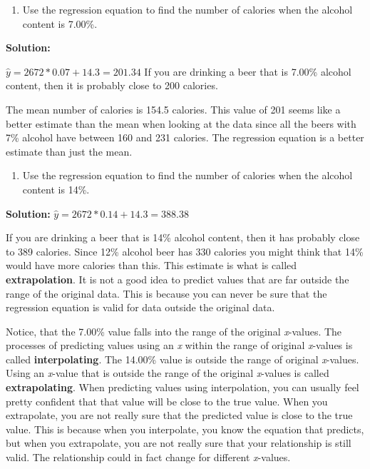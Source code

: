 \documentclass[
]{book}
\providecommand{\tightlist}{%
  \setlength{\itemsep}{0pt}\setlength{\parskip}{0pt}}
\begin{document}
\begin{enumerate}
\def\labelenumi{\alph{enumi}.}
\setcounter{enumi}{1}
\tightlist
\item
  Use the regression equation to find the number of calories when the alcohol content is 7.00\%.
\end{enumerate}

\textbf{Solution:}

\(\hat{y}=2672*0.07+14.3=201.34\) If you are drinking a beer that is 7.00\% alcohol content, then it is probably close to 200 calories.

The mean number of calories is 154.5 calories. This value of 201 seems like a better estimate than the mean when looking at the data since all the beers with 7\% alcohol have between 160 and 231 calories. The regression equation is a better estimate than just the mean.

\begin{enumerate}
\def\labelenumi{\alph{enumi}.}
\setcounter{enumi}{2}
\tightlist
\item
  Use the regression equation to find the number of calories when the alcohol content is 14\%.
\end{enumerate}

\textbf{Solution:}
\(\hat{y}=2672*0.14+14.3=388.38\)

If you are drinking a beer that is 14\% alcohol content, then it has probably close to 389 calories. Since 12\% alcohol beer has 330 calories you might think that 14\% would have more calories than this. This estimate is what is called \textbf{extrapolation}. It is not a good idea to predict values that are far outside the range of the original data. This is because you can never be sure that the regression equation is valid for data outside the original data.

Notice, that the 7.00\% value falls into the range of the original \emph{x}-values. The processes of predicting values using an \emph{x} within the range of original \emph{x}-values is called \textbf{interpolating}. The 14.00\% value is outside the range of original \emph{x}-values. Using an \emph{x}-value that is outside the range of the original \emph{x}-values is called \textbf{extrapolating}. When predicting values using interpolation, you can usually feel pretty confident that that value will be close to the true value. When you extrapolate, you are not really sure that the predicted value is close to the true value. This is because when you interpolate, you know the equation that predicts, but when you extrapolate, you are not really sure that your relationship is still valid. The relationship could in fact change for different \emph{x}-values.
\end{document}
